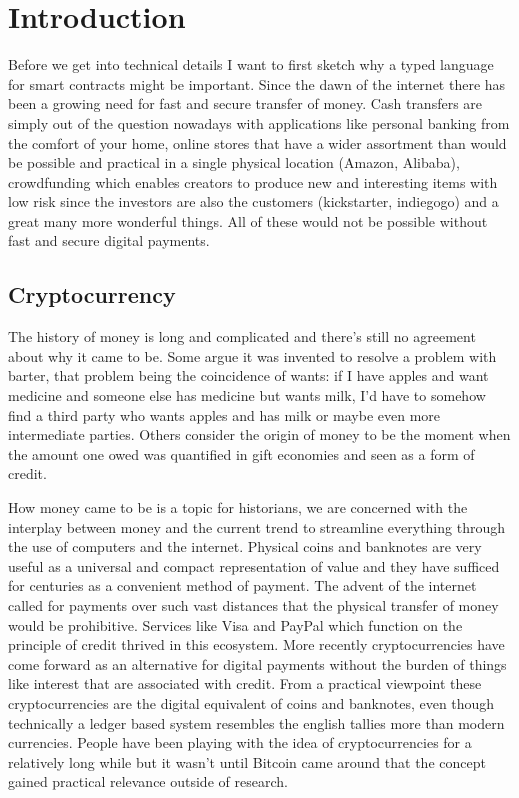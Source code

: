 \chapter{Introduction}
\label{introduction}

Before we get into technical details I want to first sketch why a typed
language for smart contracts might be important.
Since the dawn of the internet there has been a growing need for fast and
secure transfer of money.
Cash transfers are simply out of the question nowadays with applications like
personal banking from the comfort of your home, online stores that have a wider
assortment than would be possible and practical in a single physical location
(Amazon, Alibaba), crowdfunding which enables creators to produce new and
interesting items with low risk since the investors are also the customers
(kickstarter, indiegogo) and a great many more wonderful things.
All of these would not be possible without fast and secure digital payments.

\section{Cryptocurrency}

The history of money is long and complicated and there's still no agreement
about why it came to be.
Some argue it was invented to resolve a problem with barter, that problem being
the coincidence of wants: if I have apples and want medicine and someone else
has medicine but wants milk, I'd have to somehow find a third party who wants
apples and has milk or maybe even more intermediate parties.
Others consider the origin of money to be the moment when the amount one owed
was quantified in gift economies and seen as a form of credit.

How money came to be is a topic for historians, we are concerned with the
interplay between money and the current trend to streamline everything through
the use of computers and the internet.
Physical coins and banknotes are very useful as a universal and compact
representation of value and they have sufficed for centuries as a convenient
method of payment.
The advent of the internet called for payments over such vast distances that
the physical transfer of money would be prohibitive.
Services like Visa and PayPal which function on the principle of credit thrived
in this ecosystem.
More recently cryptocurrencies have come forward as an alternative for digital
payments without the burden of things like interest that are associated with
credit.
From a practical viewpoint these cryptocurrencies are the digital equivalent
of coins and banknotes, even though technically a ledger based system resembles
the english tallies more than modern currencies.
People have been playing with the idea of cryptocurrencies for a relatively
long while but it wasn't until Bitcoin came around that the concept gained
practical relevance outside of research.

